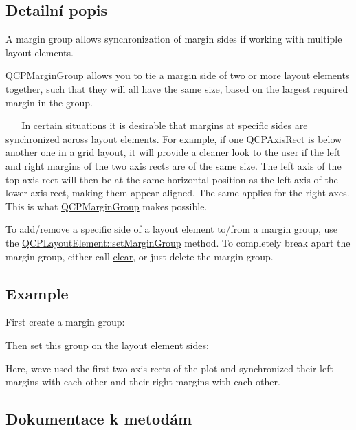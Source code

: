 \subsection{Detailní popis}
A margin group allows synchronization of margin sides if working with multiple layout elements. 

\hyperlink{classQCPMarginGroup}{Q\+C\+P\+Margin\+Group} allows you to tie a margin side of two or more layout elements together, such that they will all have the same size, based on the largest required margin in the group.

~\newline
~\newline
 In certain situations it is desirable that margins at specific sides are synchronized across layout elements. For example, if one \hyperlink{classQCPAxisRect}{Q\+C\+P\+Axis\+Rect} is below another one in a grid layout, it will provide a cleaner look to the user if the left and right margins of the two axis rects are of the same size. The left axis of the top axis rect will then be at the same horizontal position as the left axis of the lower axis rect, making them appear aligned. The same applies for the right axes. This is what \hyperlink{classQCPMarginGroup}{Q\+C\+P\+Margin\+Group} makes possible.

To add/remove a specific side of a layout element to/from a margin group, use the \hyperlink{classQCPLayoutElement_a516e56f76b6bc100e8e71d329866847d}{Q\+C\+P\+Layout\+Element\+::set\+Margin\+Group} method. To completely break apart the margin group, either call \hyperlink{classQCPMarginGroup_a144b67f216e4e86c3a3a309e850285fe}{clear}, or just delete the margin group.\hypertarget{classQCPMarginGroup_QCPMarginGroup-example}{}\subsection{Example}\label{classQCPMarginGroup_QCPMarginGroup-example}
First create a margin group\+: 
\begin{DoxyCodeInclude}
\end{DoxyCodeInclude}
Then set this group on the layout element sides\+: 
\begin{DoxyCodeInclude}
\end{DoxyCodeInclude}
Here, we\textquotesingle{}ve used the first two axis rects of the plot and synchronized their left margins with each other and their right margins with each other. 

\subsection{Dokumentace k metodám}
\hypertarget{classQCPMarginGroup_a144b67f216e4e86c3a3a309e850285fe}{}
